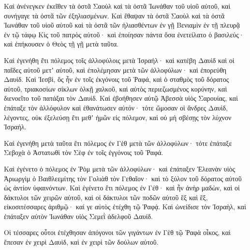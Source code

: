 {Καὶ ἁνένεγκεν ἐκεῖθεν τὰ ὀστᾶ Σαοὺλ καὶ τὰ ὀστᾶ Ἰωνάθαν τοῦ υἱοῦ αὐτοῦ, καὶ συνήγαγε τὰ ὀστᾶ τῶν ἐξηλιασμένων.
Καὶ ἔθαψαν τὰ ὀστᾶ Σαοὺλ καὶ τὰ ὀστᾶ Ἰωνάθαν τοῦ υἱοῦ αὐτοῦ καὶ τὰ ὀστᾶ τῶν ἡλιασθέντων ἐν γῇ Βενιαμὶν ἐν τῇ πλευρᾷ ἐν τῷ τάφῳ Κὶς τοῦ πατρὸς αὐτοῦ· καὶ ἐποίησαν πάντα ὅσα ἐνετείλατο ὁ βασιλεύς· καὶ ἐπήκουσεν ὁ Θεὸς τῇ γῇ μετὰ ταῦτα.
\par }{\PP {}Καὶ ἐγενήθη ἔτι πόλεμος τοῖς ἀλλοφύλοις μετὰ Ἰσραήλ· καὶ κατέβη Δαυὶδ καὶ οἱ παῖδες αὐτοῦ μετʼ αὐτοῦ, καὶ ἐπολέμησαν μετὰ τῶν ἀλλοφύλων· καὶ ἐπορεύθη Δαυίδ.
Καὶ Ἰεσβὶ, ὃς ἦν ἐν τοῖς ἐκγόνοις τοῦ Ῥαφά, καὶ ὁ σταθμὸς τοῦ δόρατος αὐτοῦ, τριακοσίων σίκλων ὁλκῇ χαλκοῦ, καὶ αὐτὸς περιεζωσμένος κορύνην, καὶ διενοεῖτο τοῦ πατάξαι τὸν Δαυίδ.
Καὶ ἐβοήθησεν αὐτῷ Ἀβεσσὰ υἱὸς Σαρουίας, καὶ ἐπάταξε τὸν ἀλλόφυλον καὶ ἐθανάτωσεν αὐτόν· τότε ὤμοσαν οἱ ἄνδρες Δαυὶδ, λέγοντες, οὐκ ἐξελεύσῃ ἔτι μεθʼ ἡμῶν εἰς πόλεμον, καὶ οὐ μὴ σβέσῃς τὸν λύχνον Ἰσραήλ.
\par }{\PP {}Καὶ ἐγενήθη μετὰ ταῦτα ἔτι πόλεμος ἐν Γὲθ μετὰ τῶν ἀλλοφύλων· τότε ἐπάταξε Σεβοχὰ ὁ Ἀστατωθὶ τὸν Σὲφ ἐν τοῖς ἐγγόνοις τοῦ Ῥαφά.
\par }{\PP {}Καὶ ἐγένετο ὁ πόλεμος ἐν Ῥὸμ μετὰ τῶν ἀλλοφύλων· καὶ ἐπάταξεν Ἐλεανὰν υἱὸς Ἀριωργὶμ ὁ Βαιθλεεμίτης τὸν Γολιὰθ τὸν Γεθαῖον· καὶ τὸ ξύλον τοῦ δόρατος αὐτοῦ ὡς ἀντίον ὑφαινόντων.
Καὶ ἐγένετο ἔτι πόλεμος ἐν Γέθ· καὶ ἦν ἀνὴρ μαδὼν, καὶ οἱ δάκτυλοι τῶν χειρῶν αὐτοῦ, καὶ οἱ δάκτυλοι τῶν ποδῶν αὐτοῦ ἓξ καὶ ἓξ, εἰκοσιτέσσαρες ἀριθμῷ· καί γε αὐτὸς ἐτέχθη τῷ Ῥαφᾴ.
Καὶ ὠνείδισε τὸν Ἰσραὴλ, καὶ ἐπάταξεν αὐτὸν Ἰωνάθαν υἱὸς Σεμεῒ ἀδελφοῦ Δαυίδ.
\par }{\PP {}Οἱ τέσσαρες οὗτοι ἐτέχθησαν ἀπόγονοι τῶν γιγάντων ἐν Γὲθ τῷ Ῥαφὰ οἶκος, καὶ ἔπεσαν ἐν χειρὶ Δαυὶδ, καὶ ἐν χειρὶ τῶν δούλων αὐτοῦ.

}
